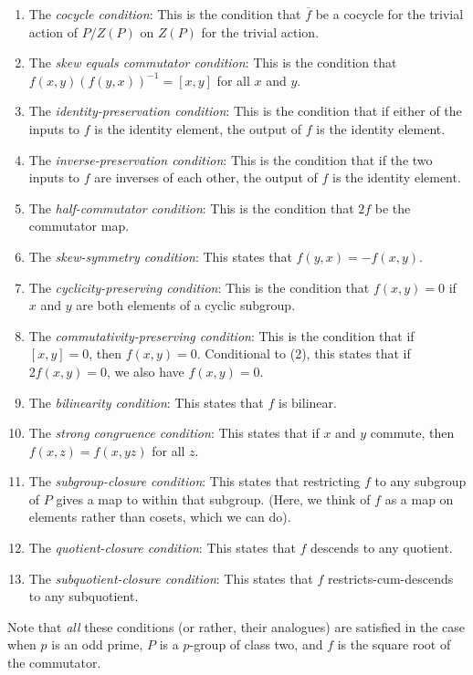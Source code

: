 \documentclass[10pt]{amsart}
\begin{document}
\begin{enumerate}
\item The {\em cocycle condition}: This is the condition that
  $\overline{f}$ be a cocycle for the trivial action of $P/Z(P)$ on
  $Z(P)$ for the trivial action.
\item The {\em skew equals commutator condition}: This is the
  condition that $f(x,y)(f(y,x))^{-1} = [x,y]$ for all $x$ and $y$.
\item The {\em identity-preservation condition}: This is the condition
  that if either of the inputs to $f$ is the identity element, the
  output of $f$ is the identity element.
\item The {\em inverse-preservation condition}: This is the condition
  that if the two inputs to $f$ are inverses of each other, the output
  of $f$ is the identity element.
\item The {\em half-commutator condition}: This is the condition that
  $2f$ be the commutator map.
\item The {\em skew-symmetry condition}: This states that $f(y,x) =
  -f(x,y)$.
\item The {\em cyclicity-preserving condition}: This is the condition
  that $f(x,y) = 0$ if $x$ and $y$ are both elements of a cyclic subgroup.
\item The {\em commutativity-preserving condition}: This is the
  condition that if $[x,y] = 0$, then $f(x,y) = 0$. Conditional to
  (2), this states that if $2f(x,y) = 0$, we also have $f(x,y) = 0$.
\item The {\em bilinearity condition}: This states that $f$ is
  bilinear.
\item The {\em strong congruence condition}: This states that if $x$
  and $y$ commute, then $f(x,z) = f(x,yz)$ for all $z$.
\item The {\em subgroup-closure condition}: This states that
  restricting $f$ to any subgroup of $P$ gives a map to within that
  subgroup. (Here, we think of $f$ as a map on elements rather than
  cosets, which we can do).
\item The {\em quotient-closure condition}: This states that $f$
  descends to any quotient.
\item The {\em subquotient-closure condition}: This states that $f$
  restricts-cum-descends to any subquotient.
\end{enumerate}

Note that {\em all} these conditions (or rather, their analogues) are
satisfied in the case when $p$ is an odd prime, $P$ is a $p$-group of
class two, and $f$ is the square root of the commutator.
\end{document}

